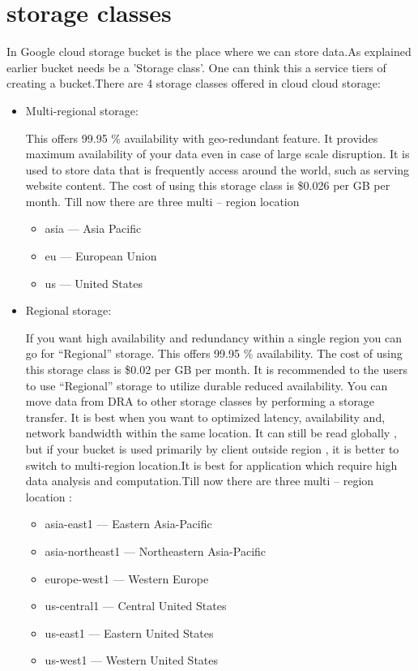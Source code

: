 \documentclass[9pt,twocolumn,twoside]{../../styles/osajnl}
\begin{document}
\section{storage classes}

In Google cloud storage bucket is the place where we can store data.As explained earlier bucket needs be a 'Storage class'. One can think this a service tiers of creating a bucket.There are 4 storage classes offered in cloud cloud storage:

\begin{itemize}

\item Multi-regional storage:

This offers 99.95 \% availability with geo-redundant feature. It provides maximum availability of your data even in case of large scale disruption. It is used to store data that is frequently access around the world, such as serving website content. The cost of using this storage class is \$0.026 per GB per month. Till now there are three multi – region location 
		\begin{itemize}

			\item asia — Asia Pacific
			\item eu — European Union
			\item us — United States

		\end{itemize}
		
\item Regional storage:

If you want high availability and redundancy within a single region you can go for “Regional”  storage. This offers 99.95 \% availability. The cost of using this storage class is \$0.02 per GB per month. It is recommended to the users to use “Regional”  storage to utilize durable  reduced  availability. You can move data from DRA to other storage classes by performing a storage transfer. It is best when you want to optimized latency, availability and, network bandwidth within the same location. It can still be read globally , but if your bucket is used primarily by client outside region , it is better to switch to multi-region location.It is best for application which require high data analysis and computation.Till now there are three multi – region location :

		\begin{itemize}

			\item asia-east1 — Eastern Asia-Pacific
			\item asia-northeast1 — Northeastern Asia-Pacific
			\item europe-west1 — Western Europe
			\item us-central1 — Central United States
			\item us-east1 — Eastern United States
			\item us-west1 — Western United States


\end{itemize}
\end{itemize}
\end{document}

